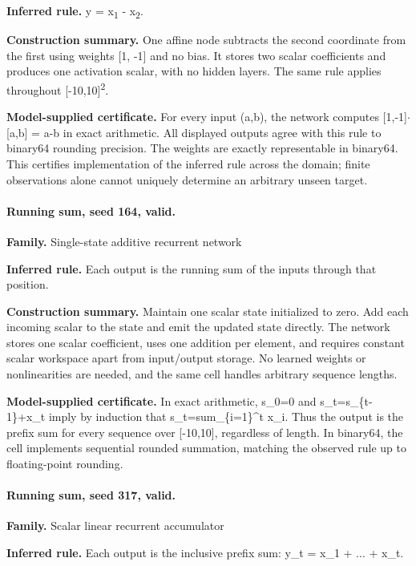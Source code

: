 \textbf{Inferred rule.} y = x\textsubscript{1} - x\textsubscript{2}.


\textbf{Construction summary.} One affine node subtracts the second coordinate from the first using weights [1, -1] and no bias. It stores two scalar coefficients and produces one activation scalar, with no hidden layers. The same rule applies throughout [-10,10]\textsuperscript{2}.


\textbf{Model-supplied certificate.} For every input (a,b), the network computes [1,-1]\ensuremath{\cdot}[a,b] = a-b in exact arithmetic. All displayed outputs agree with this rule to binary64 rounding precision. The weights are exactly representable in binary64. This certifies implementation of the inferred rule across the domain; finite observations alone cannot uniquely determine an arbitrary unseen target.


\paragraph{Running sum, seed 164, valid.}

\textbf{Family.} Single-state additive recurrent network


\textbf{Inferred rule.} Each output is the running sum of the inputs through that position.


\textbf{Construction summary.} Maintain one scalar state initialized to zero. Add each incoming scalar to the state and emit the updated state directly. The network stores one scalar coefficient, uses one addition per element, and requires constant scalar workspace apart from input/output storage. No learned weights or nonlinearities are needed, and the same cell handles arbitrary sequence lengths.


\textbf{Model-supplied certificate.} In exact arithmetic, s\_0=0 and s\_t=s\_\{t-1\}+x\_t imply by induction that s\_t=sum\_\{i=1\}\textasciicircum{}t x\_i. Thus the output is the prefix sum for every sequence over [-10,10], regardless of length. In binary64, the cell implements sequential rounded summation, matching the observed rule up to floating-point rounding.


\paragraph{Running sum, seed 317, valid.}

\textbf{Family.} Scalar linear recurrent accumulator


\textbf{Inferred rule.} Each output is the inclusive prefix sum: y\_t = x\_1 + ... + x\_t.



